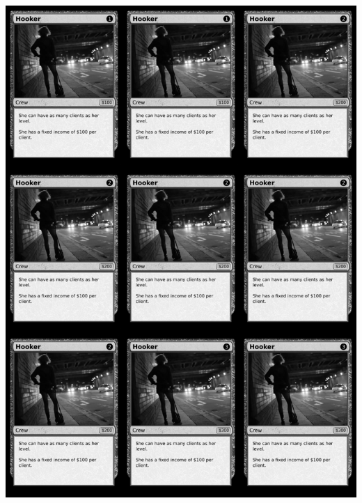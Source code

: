 \documentclass[a4paper]{article}
\begin{document}
\begin{center}
	\centering
	\includegraphics[width=190.5mm,height=266.7mm]{output/temp/page13.png}
\end{center}

\newpage
\end{document}
